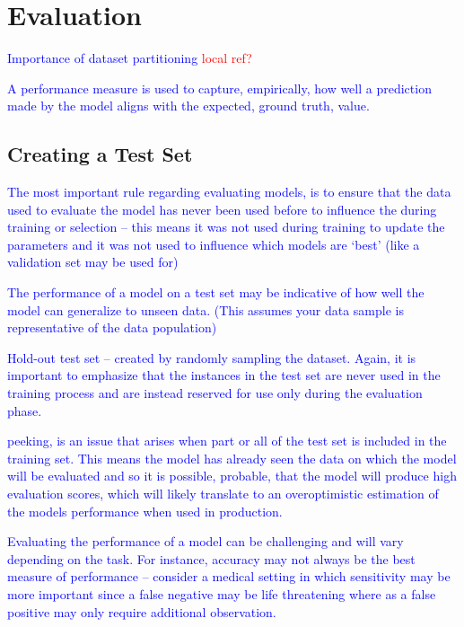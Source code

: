 \section{Evaluation}

\textcolor{blue}{Importance of dataset partitioning \textcolor{red}{local ref?}}


\textcolor{blue}{A performance measure is used to capture, empirically, how well a prediction made by the model aligns with the expected, ground truth, value.}

\subsection{Creating a Test Set}

\textcolor{blue}{The most important rule regarding evaluating models, is to ensure that the data used to evaluate the model has never been used before to influence the during training or selection -- this means it was not used during training to update the parameters and it was not used to influence which models are `best' (like a validation set may be used for)}

\textcolor{blue}{The performance of a model on a test set may be indicative of how well the model can generalize to unseen data. (This assumes your data sample is representative of the data population)}

\textcolor{blue}{Hold-out test set -- created by randomly sampling the dataset. Again, it is important to emphasize that the instances in the test set are never used in the training process and are instead reserved for use only during the evaluation phase.}

\textcolor{blue}{peeking, is an issue that arises when part or all of the test set is included in the training set. This means the model has already seen the data on which the model will be evaluated and so it is possible, probable, that the model will produce high evaluation scores, which will likely translate to an overoptimistic estimation of the models performance when used in production.}

\textcolor{blue}{Evaluating the performance of a model can be challenging and will vary depending on the task. For instance, accuracy may not always be the best measure of performance -- consider a medical setting in which sensitivity may be more important since a false negative may be life threatening where as a false positive may only require additional observation.}

